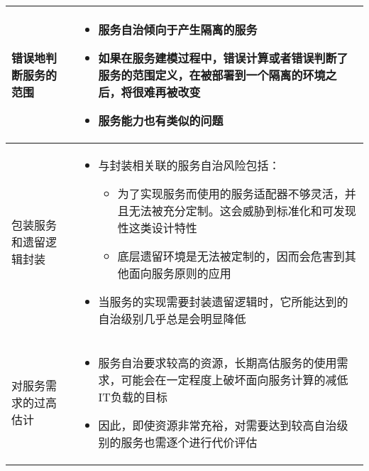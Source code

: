 \begin{longtable}{|m{3cm}<{\centering}|m{12cm}|}
    \hline
    错误地判断服务的范围
    & 
    \vspace{-1.3em}
    \begin{itemize}[leftmargin=1.5em,itemsep=-3pt,topsep=-3pt]
        \item 服务自治倾向于产生隔离的服务
        \item 如果在服务建模过程中，错误计算或者错误判断了服务的范围定义，在被部署到一个隔离的环境之后，将很难再被改变
        \item 服务能力也有类似的问题
    \vspace{-1.5em}
    \end{itemize}  
    \\ \hline
    包装服务和遗留逻辑封装
    & 
    \vspace{-1.3em}
    \begin{itemize}[leftmargin=1.5em,itemsep=-3pt,topsep=-3pt]
        \item 与封装相关联的服务自治风险包括：
        \begin{itemize}[leftmargin=1.5em,itemsep=-3pt,topsep=-3pt]
            \item 为了实现服务而使用的服务适配器不够灵活，并且无法被充分定制。这会威胁到标准化和可发现性这类设计特性
            \item 底层遗留环境是无法被定制的，因而会危害到其他面向服务原则的应用
        \end{itemize} 
        \item 当服务的实现需要封装遗留逻辑时，它所能达到的自治级别几乎总是会明显降低
    \vspace{-1.5em}
    \end{itemize}  
    \\ \hline
    对服务需求的过高估计
    & 
    \vspace{-1.3em}
    \begin{itemize}[leftmargin=1.5em,itemsep=-3pt,topsep=-3pt]
        \item 服务自治要求较高的资源，长期高估服务的使用需求，可能会在一定程度上破坏面向服务计算的减低IT负载的目标
        \item 因此，即使资源非常充裕，对需要达到较高自治级别的服务也需逐个进行代价评估
    \vspace{-1.5em}
    \end{itemize}  
    \\ \hline
\end{longtable}